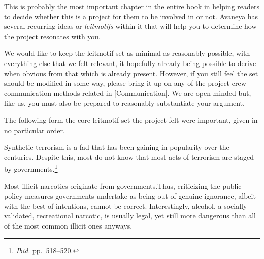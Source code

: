 

This is probably the most important chapter in the entire book in helping readers to decide whether this is a project for them to be involved in or not. Avaneya has several recurring ideas or {\it leitmotifs} within it that will help you to determine how the project resonates with you.

We would like to keep the leitmotif set as minimal as reasonably possible, with everything else that we felt relevant, it hopefully already being possible to derive when obvious from that which is already present. However, if you still feel the set should be modified in some way, please bring it up on any of the project crew communication methods related in [Communication]. We are open minded but, like us, you must also be prepared to reasonably substantiate your argument.

The following form the core leitmotif set the project felt were important, given in no particular order.

\startitemize[4]

Synthetic terrorism is a fad that has been gaining in popularity over the centuries. Despite this, most do not know that most acts of terrorism are staged by governments.\footnotecite[extras={ p.~193.}][shirer1960]\footnote{{\it Ibid.} pp.~518--520.}\footnotecite[harrit2009]\footnotecite[northwoods]


Most illicit narcotics originate from governments. Thus, criticizing the public policy measures governments undertake as being out of genuine ignorance, albeit with the best of intentions, cannot be correct. Interestingly, alcohol, a socially validated, recreational narcotic, is usually legal, yet still more dangerous than all of the most common illicit ones anyways.\footnotecite[extras={ See figure 2.}][nutt2010]

